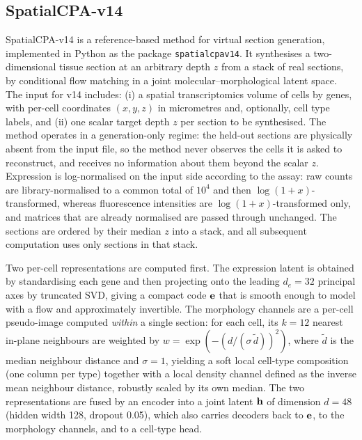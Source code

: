 \subsection{SpatialCPA-v14} \label{subsec:spatialcpav14}

SpatialCPA-v14 is a reference-based method for virtual section generation, implemented in Python as
the package \texttt{spatialcpav14}. It synthesises a two-dimensional tissue section at an arbitrary
depth $z$ from a stack of real sections, by conditional flow matching in a joint
molecular--morphological latent space. The input for v14 includes: (i) a spatial transcriptomics
volume of cells by genes, with per-cell coordinates $(x, y, z)$ in micrometres and, optionally, cell
type labels, and (ii) one scalar target depth $z$ per section to be synthesised. The method operates
in a generation-only regime: the held-out sections are physically absent from the input file, so the
method never observes the cells it is asked to reconstruct, and receives no information about them
beyond the scalar $z$. Expression is log-normalised on the input side according to the assay: raw
counts are library-normalised to a common total of $10^{4}$ and then $\log(1+x)$-transformed, whereas
fluorescence intensities are $\log(1+x)$-transformed only, and matrices that are already normalised
are passed through unchanged. The sections are ordered by their median $z$ into a stack, and all
subsequent computation uses only sections in that stack.

Two per-cell representations are computed first. The expression latent is obtained by standardising
each gene and then projecting onto the leading $d_{e} = 32$ principal axes by truncated SVD, giving a
compact code $\textrm{\textbf{e}}$ that is smooth enough to model with a flow and approximately
invertible. The morphology channels are a per-cell pseudo-image computed \textit{within} a single
section: for each cell, its $k = 12$ nearest in-plane neighbours are weighted by
$w = \exp\left(-\left(d / (\sigma \, \tilde{d})\right)^{2}\right)$, where $\tilde{d}$ is the median
neighbour distance and $\sigma = 1$, yielding a soft local cell-type composition (one column per type)
together with a local density channel defined as the inverse mean neighbour distance, robustly scaled
by its own median. The two representations are fused by an encoder into a joint latent
$\textrm{\textbf{h}}$ of dimension $d = 48$ (hidden width 128, dropout 0.05), which also carries
decoders back to $\textrm{\textbf{e}}$, to the morphology channels, and to a cell-type head.

